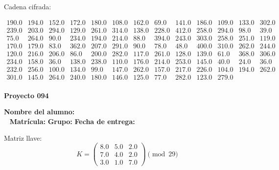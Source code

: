\documentclass[12pt]{article}
\begin{document}
Cadena cifrada:
\begin{center}
$\begin{array}{lllllllllllll}
190.0 & 194.0 & 152.0 & 172.0 & 180.0 & 108.0 & 162.0 & 69.0 & 141.0 & 186.0 & 109.0 & 133.0 & 302.0\\
239.0 & 203.0 & 294.0 & 129.0 & 261.0 & 314.0 & 138.0 & 228.0 & 412.0 & 258.0 & 294.0 & 98.0 & 39.0\\
75.0 & 264.0 & 90.0 & 234.0 & 194.0 & 214.0 & 88.0 & 394.0 & 243.0 & 303.0 & 258.0 & 251.0 & 119.0\\
170.0 & 179.0 & 83.0 & 362.0 & 207.0 & 291.0 & 90.0 & 78.0 & 48.0 & 400.0 & 310.0 & 262.0 & 244.0\\
120.0 & 216.0 & 206.0 & 86.0 & 200.0 & 282.0 & 117.0 & 261.0 & 128.0 & 139.0 & 61.0 & 368.0 & 306.0\\
234.0 & 158.0 & 36.0 & 138.0 & 238.0 & 110.0 & 176.0 & 214.0 & 253.0 & 145.0 & 40.0 & 24.0 & 36.0\\
232.0 & 256.0 & 100.0 & 134.0 & 99.0 & 147.0 & 262.0 & 157.0 & 217.0 & 226.0 & 104.0 & 194.0 & 262.0\\
301.0 & 145.0 & 264.0 & 240.0 & 180.0 & 146.0 & 125.0 & 77.0 & 282.0 & 123.0 & 279.0\\
\end{array}$
\end{center}

\newpage


\textbf{Proyecto 094}

\textbf{Nombre del alumno:} \underline{\hspace{13cm}}\\\
\vspace{1cm}
\textbf{Matrícula:} \underline{\hspace{4cm}} \hspace{1cm}
\textbf{Grupo:} \underline{\hspace{2cm}}
\textbf{Fecha de entrega:} \underline{\hspace{2cm}}

\medskip

Matriz llave:
\[
K = \begin{pmatrix}
8.0 & 5.0 & 2.0\\
7.0 & 4.0 & 2.0\\
3.0 & 1.0 & 7.0
\end{pmatrix} \pmod{29}
\]
\end{document}
